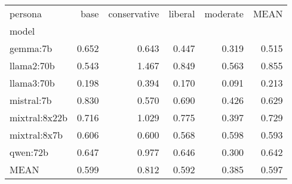 \begin{table}
\label{tab:questionnaire:sosec.var.agg}
\begin{tabular}{lrrrrr}
\toprule
persona & base & conservative & liberal & moderate & MEAN \\
model &  &  &  &  &  \\
\midrule
gemma:7b & 0.652 & 0.643 & 0.447 & 0.319 & 0.515 \\
llama2:70b & 0.543 & 1.467 & 0.849 & 0.563 & 0.855 \\
llama3:70b & 0.198 & 0.394 & 0.170 & 0.091 & 0.213 \\
mistral:7b & 0.830 & 0.570 & 0.690 & 0.426 & 0.629 \\
mixtral:8x22b & 0.716 & 1.029 & 0.775 & 0.397 & 0.729 \\
mixtral:8x7b & 0.606 & 0.600 & 0.568 & 0.598 & 0.593 \\
qwen:72b & 0.647 & 0.977 & 0.646 & 0.300 & 0.642 \\
MEAN & 0.599 & 0.812 & 0.592 & 0.385 & 0.597 \\
\bottomrule
\end{tabular}
\end{table}
